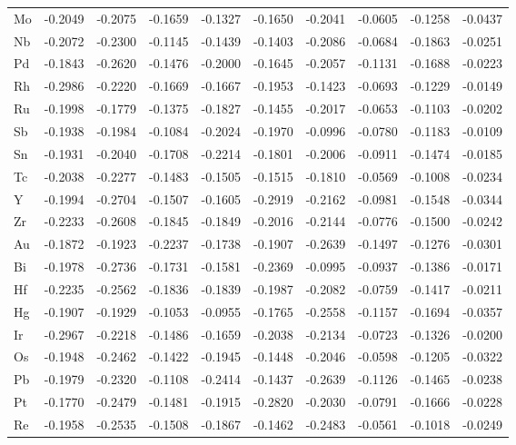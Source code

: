 \begin{table}[h]
{\begin{tabular}{*{10}{l}}
      Mo & -0.2049 & -0.2075 & -0.1659 & -0.1327 & -0.1650 & -0.2041 & -0.0605 & -0.1258 & -0.0437 \\
      Nb & -0.2072 & -0.2300 & -0.1145 & -0.1439 & -0.1403 & -0.2086 & -0.0684 & -0.1863 & -0.0251 \\
      Pd & -0.1843 & -0.2620 & -0.1476 & -0.2000 & -0.1645 & -0.2057 & -0.1131 & -0.1688 & -0.0223 \\
      Rh & -0.2986 & -0.2220 & -0.1669 & -0.1667 & -0.1953 & -0.1423 & -0.0693 & -0.1229 & -0.0149 \\
      Ru & -0.1998 & -0.1779 & -0.1375 & -0.1827 & -0.1455 & -0.2017 & -0.0653 & -0.1103 & -0.0202 \\
      Sb & -0.1938 & -0.1984 & -0.1084 & -0.2024 & -0.1970 & -0.0996 & -0.0780 & -0.1183 & -0.0109 \\
      Sn & -0.1931 & -0.2040 & -0.1708 & -0.2214 & -0.1801 & -0.2006 & -0.0911 & -0.1474 & -0.0185 \\
      Tc & -0.2038 & -0.2277 & -0.1483 & -0.1505 & -0.1515 & -0.1810 & -0.0569 & -0.1008 & -0.0234 \\
      Y  & -0.1994 & -0.2704 & -0.1507 & -0.1605 & -0.2919 & -0.2162 & -0.0981 & -0.1548 & -0.0344 \\
      Zr & -0.2233 & -0.2608 & -0.1845 & -0.1849 & -0.2016 & -0.2144 & -0.0776 & -0.1500 & -0.0242 \\
      Au & -0.1872 & -0.1923 & -0.2237 & -0.1738 & -0.1907 & -0.2639 & -0.1497 & -0.1276 & -0.0301 \\
      Bi & -0.1978 & -0.2736 & -0.1731 & -0.1581 & -0.2369 & -0.0995 & -0.0937 & -0.1386 & -0.0171 \\
      Hf & -0.2235 & -0.2562 & -0.1836 & -0.1839 & -0.1987 & -0.2082 & -0.0759 & -0.1417 & -0.0211 \\
      Hg & -0.1907 & -0.1929 & -0.1053 & -0.0955 & -0.1765 & -0.2558 & -0.1157 & -0.1694 & -0.0357 \\
      Ir & -0.2967 & -0.2218 & -0.1486 & -0.1659 & -0.2038 & -0.2134 & -0.0723 & -0.1326 & -0.0200 \\
      Os & -0.1948 & -0.2462 & -0.1422 & -0.1945 & -0.1448 & -0.2046 & -0.0598 & -0.1205 & -0.0322 \\
      Pb & -0.1979 & -0.2320 & -0.1108 & -0.2414 & -0.1437 & -0.2639 & -0.1126 & -0.1465 & -0.0238 \\
      Pt & -0.1770 & -0.2479 & -0.1481 & -0.1915 & -0.2820 & -0.2030 & -0.0791 & -0.1666 & -0.0228 \\
      Re & -0.1958 & -0.2535 & -0.1508 & -0.1867 & -0.1462 & -0.2483 & -0.0561 & -0.1018 & -0.0249 \\

\end{tabular}}
\end{table}
